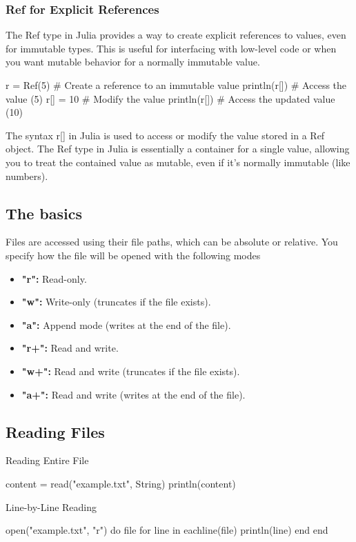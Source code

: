 \documentclass{report}
\begin{document}
     \subsubsection{Ref for Explicit References}
     \bigbreak \noindent 
     The Ref type in Julia provides a way to create explicit references to values, even for immutable types. This is useful for interfacing with low-level code or when you want mutable behavior for a normally immutable value.
     \bigbreak \noindent 
     \begin{jlcode}
         r = Ref(5)  # Create a reference to an immutable value
         println(r[])  # Access the value (5)
         r[] = 10     # Modify the value
         println(r[])  # Access the updated value (10)
     \end{jlcode}
     \bigbreak \noindent 
     The syntax r[] in Julia is used to access or modify the value stored in a Ref object. The Ref type in Julia is essentially a container for a single value, allowing you to treat the contained value as mutable, even if it's normally immutable (like numbers).


     \pagebreak 
     \bigbreak \noindent 
     \subsection{The basics}
     \bigbreak \noindent 
     Files are accessed using their file paths, which can be absolute or relative. You specify how the file will be opened with the following modes
     \begin{itemize}
         \item \textbf{"r":} Read-only.
         \item \textbf{"w":} Write-only (truncates if the file exists).
         \item \textbf{"a":} Append mode (writes at the end of the file).
         \item \textbf{"r+":} Read and write.
         \item \textbf{"w+":} Read and write (truncates if the file exists).
         \item \textbf{"a+":} Read and write (writes at the end of the file).
     \end{itemize}

     \bigbreak \noindent 
     \subsection{Reading Files}
     \bigbreak \noindent 
     Reading Entire File
     \bigbreak \noindent 
     \begin{jlcode}
         content = read("example.txt", String)
         println(content)
     \end{jlcode}
     \bigbreak \noindent 
     Line-by-Line Reading
     \bigbreak \noindent 
     \begin{jlcode}
         open("example.txt", "r") do file
             for line in eachline(file)
                 println(line)
             end
         end
     \end{jlcode}
\end{document}
